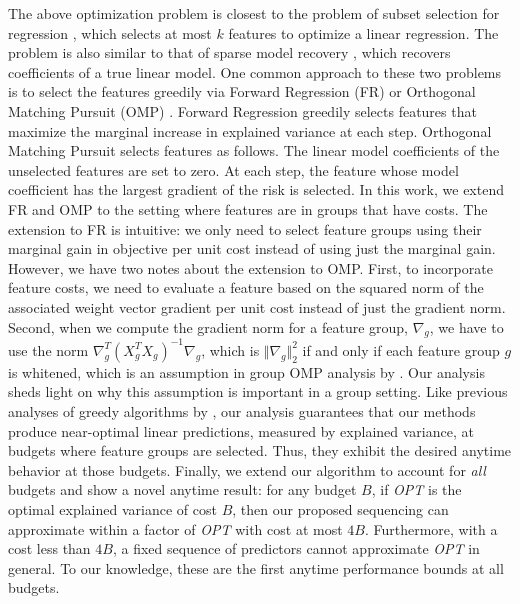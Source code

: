 The above optimization problem is closest to the problem of subset selection 
for regression \citep{kemp}, which selects at most $k$ features to optimize a 
linear regression. The problem is also similar to that of sparse model recovery 
\citep{lasso}, which recovers coefficients of a true linear model. 
One common approach to these two problems is to select the features greedily 
via Forward Regression (FR) \citep{FR} or Orthogonal Matching Pursuit (OMP) \citep{omp}. 
Forward Regression greedily selects features 
that maximize the marginal increase in explained 
variance at each step. 
Orthogonal Matching Pursuit selects features as follows. The linear model coefficients of the unselected 
features are set to zero. At each step, the feature whose model 
coefficient has the largest gradient of the risk is selected. 
In this work, we extend FR and OMP to the setting where features are in  
groups that have costs. The extension to FR is intuitive: we
only need to select feature groups using their marginal gain in 
objective per unit cost instead of using just the marginal gain. However, we have
two notes about the extension to OMP. First, to incorporate feature
costs, we need to evaluate a feature based on the squared norm of 
the associated weight vector gradient per unit cost instead of just the gradient norm. 
Second, when we compute the gradient norm for a feature group, $\nabla_g$, 
we have to use the norm $\nabla_g ^T (X_g^TX_g)^{-1} \nabla_g$, which is 
$\Vert \nabla_g \Vert_2^2$ if and only
if each feature group $g$ is whitened, which is an assumption 
in group OMP analysis by \citet{gomp, log_gomp}. Our analysis 
sheds light  on why this assumption is important in a group setting. 
Like previous analyses of greedy algorithms by \cite{streeter:08},
our analysis guarantees that our methods produce near-optimal linear predictions, measured by explained variance, 
at budgets where feature groups are selected. Thus, they exhibit the desired anytime behavior at those budgets. Finally, 
we extend our algorithm to account for \textit{all} budgets and show 
a novel anytime result: for any budget $B$, 
if \textit{OPT} is the optimal explained 
variance of cost $B$, then our proposed sequencing can approximate 
within a factor of \textit{OPT} with cost at most $4B$. 
Furthermore, with a cost less than $4B$,
a fixed sequence of predictors cannot approximate \textit{OPT} in general. 
To our knowledge, these are the first  anytime performance bounds
at all budgets. 


